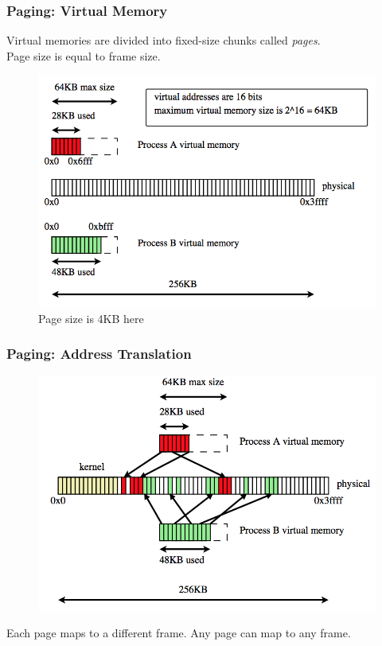 \documentclass[12pt]{article}
\theoremstyle{plain}
\theoremstyle{definition}
\begin{document}
\subsubsection{Paging: Virtual Memory}
Virtual memories are divided into fixed-size chunks called \emph{pages}. \\
Page size is equal to frame size.
\begin{figure}[H]
  \centering
  \includegraphics[scale=0.8]{pictures/paging_v_mem.png}
  \caption{Page size is 4KB here}
  \label{fig:p_v_mem}
\end{figure}

\subsubsection{Paging: Address Translation}
\begin{figure}[H]
  \centering
  \includegraphics[scale=0.7]{pictures/p_translation.png}
  \label{fig:p_trans}
\end{figure}
Each page maps to a different frame.
Any page can map to any frame.
\end{document}
